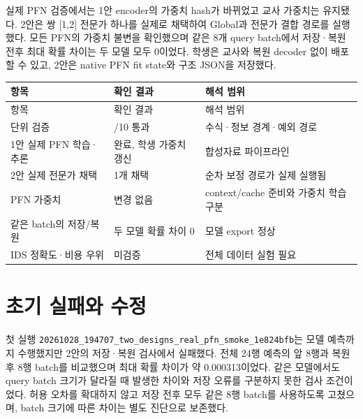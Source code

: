 실제 PFN 검증에서는 1안 encoder의 가중치 hash가 바뀌었고 교사 가중치는 유지됐다. 2안은 쌍 [1,2] 전문가 하나를 실제로 채택하여 Global과 전문가 결합 경로를 실행했다. 모든 PFN의 가중치 불변을 확인했으며 같은 8개 query batch에서 저장·복원 전후 최대 확률 차이는 두 모델 모두 0이었다. 학생은 교사와 복원 decoder 없이 배포할 수 있고, 2안은 native PFN fit state와 구조 JSON을 저장했다.

\begingroup
\footnotesize
\begin{longtable}{>{\raggedright\arraybackslash}p{}>{\raggedright\arraybackslash}p{}>{\raggedright\arraybackslash}p{}}
\toprule
항목 & 확인 결과 & 해석 범위 \\ \midrule
\endfirsthead
항목 & 확인 결과 & 해석 범위 \\ \midrule
\endhead
{}단위 검증 & 10/\allowbreak{}10 통과 & 수식·정보 경계·예외 경로 \\
{}1안 실제 PFN 학습·추론 & 완료, 학생 가중치 갱신 & 합성자료 파이프라인 \\
{}2안 실제 전문가 채택 & 1개 채택 & 순차 보정 경로가 실제 실행됨 \\
{}PFN 가중치 & 변경 없음 & context/\allowbreak{}cache 준비와 가중치 학습 구분 \\
{}같은 batch의 저장/\allowbreak{}복원 & 두 모델 확률 차이 0 & 모델 export 정상 \\
{}IDS 정확도·비용 우위 & 미검증 & 전체 데이터 실험 필요 \\
\bottomrule
\end{longtable}
\endgroup
\section{초기 실패와 수정}
첫 실행 \texttt{20261028\allowbreak{}\_\allowbreak{}\allowbreak{}194707\_\allowbreak{}\allowbreak{}two\_\allowbreak{}\allowbreak{}desi\allowbreak{}gns\_\allowbreak{}\allowbreak{}real\allowbreak{}\_\allowbreak{}\allowbreak{}pfn\_\allowbreak{}\allowbreak{}smo\allowbreak{}ke\_\allowbreak{}\allowbreak{}1e824\allowbreak{}bfb}는 모델 예측까지 수행했지만 2안의 저장·복원 검사에서 실패했다. 전체 24행 예측의 앞 8행과 복원 후 8행 batch를 비교했으며 최대 확률 차이가 약 0.000313이었다. 같은 모델에서도 query batch 크기가 달라질 때 발생한 차이와 저장 오류를 구분하지 못한 검사 조건이었다. 허용 오차를 확대하지 않고 저장 전후 모두 같은 8행 batch를 사용하도록 고쳤으며, batch 크기에 따른 차이는 별도 진단으로 보존했다.

